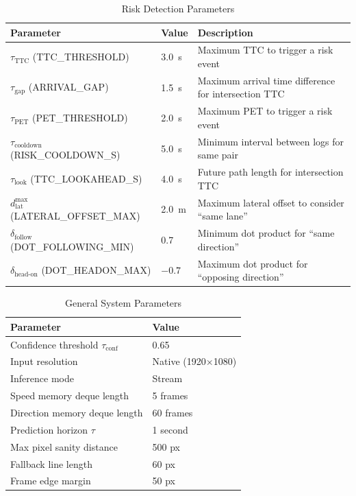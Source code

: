 \documentclass[12pt]{report}
\begin{document}
\begin{table}[H]
    \centering
    \caption{Risk Detection Parameters}
    \label{tab:risk_params}
    \begin{tabular}{llp{6cm}}
        \toprule
        \textbf{Parameter} & \textbf{Value} & \textbf{Description} \\
        \midrule
        $\tau_\text{TTC}$ (TTC\_THRESHOLD) & 3.0~s & Maximum TTC to trigger a risk event \\
        $\tau_\text{gap}$ (ARRIVAL\_GAP) & 1.5~s & Maximum arrival time difference for intersection TTC \\
        $\tau_\text{PET}$ (PET\_THRESHOLD) & 2.0~s & Maximum PET to trigger a risk event \\
        $\tau_\text{cooldown}$ (RISK\_COOLDOWN\_S) & 5.0~s & Minimum interval between logs for same pair \\
        $\tau_\text{look}$ (TTC\_LOOKAHEAD\_S) & 4.0~s & Future path length for intersection TTC \\
        $d_\text{lat}^\text{max}$ (LATERAL\_OFFSET\_MAX) & 2.0~m & Maximum lateral offset to consider ``same lane'' \\
        $\delta_\text{follow}$ (DOT\_FOLLOWING\_MIN) & 0.7 & Minimum dot product for ``same direction'' \\
        $\delta_\text{head-on}$ (DOT\_HEADON\_MAX) & $-0.7$ & Maximum dot product for ``opposing direction'' \\
        \bottomrule
    \end{tabular}
\end{table}

\begin{table}[H]
    \centering
    \caption{General System Parameters}
    \label{tab:hyperparams}
    \begin{tabular}{ll}
        \toprule
        \textbf{Parameter} & \textbf{Value} \\
        \midrule
        Confidence threshold $\tau_\text{conf}$ & 0.65 \\
        Input resolution & Native (1920$\times$1080) \\
        Inference mode & Stream \\
        Speed memory deque length & 5 frames \\
        Direction memory deque length & 60 frames \\
        Prediction horizon $\tau$ & 1 second \\
        Max pixel sanity distance & 500 px \\
        Fallback line length & 60 px \\
        Frame edge margin & 50 px \\
        \bottomrule
    \end{tabular}
\end{table}
\end{document}
